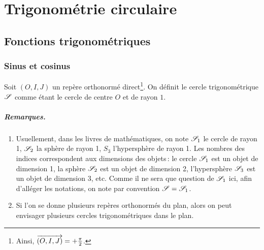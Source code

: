 \chapter{Trigonométrie circulaire}\label{chap_fcttrigo}


\section{Fonctions trigonométriques}
	

	\subsection{Sinus et cosinus}\label{subsec_sincos}
		\begin{defi}
			Soit $(O,I,J)$ un repère orthonormé direct\footnote{Ainsi, $\ovr{(O,I,J)}=+\frac{\pi}{2}$.}. On définit le cercle trigonométrique $\S$ comme étant le cercle de centre $O$ et de rayon $1$.
		\end{defi}
		\paragraph{Remarques.} 

		\begin{enumerate}
			\item Usuellement, dans les livres de mathématiques, on note $\S_1$ le cercle de rayon 1, $\S_2$ la sphère de rayon 1, $S_3$ l'hypersphère de rayon 1. Les nombres des indices correspondent aux dimensions des objets\,: le cercle $\S_1$ est un objet de dimension 1, la sphère $\S_2$ est un objet de dimension 2, l'hypersphère $\S_3$ est un objet de dimension 3, etc. Comme il ne sera que question de $\S_1$ ici, afin d'alléger les notations, on note par convention $\S=\S_1$.
		
			\item Si l'on se donne plusieurs repères orthonormés du plan, alors on peut envisager plusieurs cercles trigonométriques dans le plan.
		\end{enumerate}


